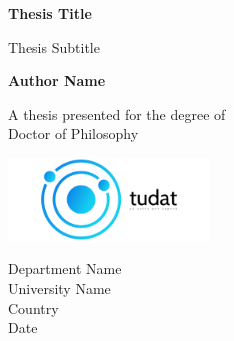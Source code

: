 \begin{titlepage}
    \begin{center}
        \vspace*{1cm}

        \textbf{Thesis Title}

        \vspace{0.5cm}
        Thesis Subtitle

        \vspace{1.5cm}

        \textbf{Author Name}

        \vfill

        A thesis presented for the degree of\\
        Doctor of Philosophy

        \vspace{0.8cm}

        \includegraphics[width=0.4\textwidth]{_static/cover.png}

        Department Name\\
        University Name\\
        Country\\
        Date

    \end{center}
\end{titlepage}